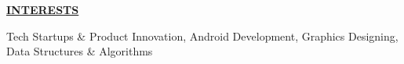 \documentclass[a4paper]{deedy-resume} %
\begin{document}


\sectionspace

{\uppercase\uline{\textbf{\large{INTERESTS}}\hfill}}

\microspace
Tech Startups \& Product Innovation, Android Development, Graphics Designing, Data Structures \& Algorithms
\minispace
\end{document}
